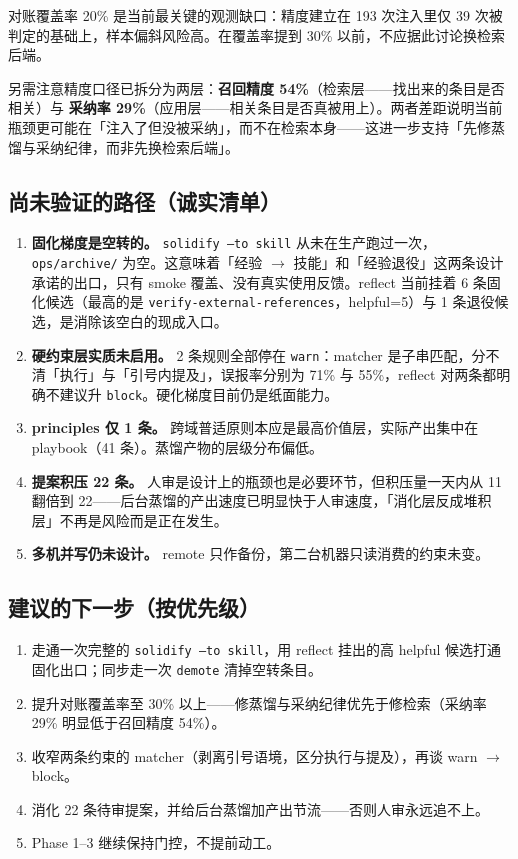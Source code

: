 \documentclass[12pt,a4paper]{ctexart}
\begin{document}
\begin{warnbox}
对账覆盖率 20\% 是当前最关键的观测缺口：精度建立在 193 次注入里仅 39 次被判定的基础上，样本偏斜风险高。在覆盖率提到 30\% 以前，不应据此讨论换检索后端。

另需注意精度口径已拆分为两层：\textbf{召回精度 54\%}（检索层——找出来的条目是否相关）与 \textbf{采纳率 29\%}（应用层——相关条目是否真被用上）。两者差距说明当前瓶颈更可能在「注入了但没被采纳」，而不在检索本身——这进一步支持「先修蒸馏与采纳纪律，而非先换检索后端」。
\end{warnbox}

\subsection{尚未验证的路径（诚实清单）}

\begin{enumerate}
  \item {\sloppy \textbf{固化梯度是空转的。} \texttt{solidify --to skill} 从未在生产跑过一次，\texttt{ops/archive/} 为空。这意味着「经验 $\rightarrow$ 技能」和「经验退役」这两条设计承诺的出口，只有 smoke 覆盖、没有真实使用反馈。reflect 当前挂着 6 条固化候选（最高的是 \texttt{verify-external-references}，helpful=5）与 1 条退役候选，是消除该空白的现成入口。\par}
  \item \textbf{硬约束层实质未启用。} 2 条规则全部停在 \texttt{warn}：matcher 是子串匹配，分不清「执行」与「引号内提及」，误报率分别为 71\% 与 55\%，reflect 对两条都明确不建议升 \texttt{block}。硬化梯度目前仍是纸面能力。
  \item \textbf{principles 仅 1 条。} 跨域普适原则本应是最高价值层，实际产出集中在 playbook（41 条）。蒸馏产物的层级分布偏低。
  \item \textbf{提案积压 22 条。} 人审是设计上的瓶颈也是必要环节，但积压量一天内从 11 翻倍到 22——后台蒸馏的产出速度已明显快于人审速度，「消化层反成堆积层」不再是风险而是正在发生。
  \item \textbf{多机并写仍未设计。} remote 只作备份，第二台机器只读消费的约束未变。
\end{enumerate}

\subsection{建议的下一步（按优先级）}

\begin{enumerate}
  \item 走通一次完整的 \texttt{solidify --to skill}，用 reflect 挂出的高 helpful 候选打通固化出口；同步走一次 \texttt{demote} 清掉空转条目。
  \item 提升对账覆盖率至 30\% 以上——修蒸馏与采纳纪律优先于修检索（采纳率 29\% 明显低于召回精度 54\%）。
  \item 收窄两条约束的 matcher（剥离引号语境，区分执行与提及），再谈 warn $\rightarrow$ block。
  \item 消化 22 条待审提案，并给后台蒸馏加产出节流——否则人审永远追不上。
  \item Phase 1--3 继续保持门控，不提前动工。
\end{enumerate}
\end{document}
